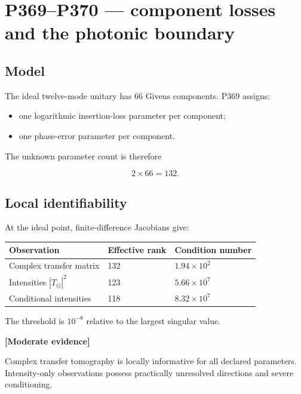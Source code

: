 \documentclass[11pt,a4paper,openany]{report}
\newcommand{\statusModerate}{\textcolor{finviolet}{[Moderate evidence]}}
\begin{document}
\chapter{P369--P370 --- component losses and the photonic boundary}

\section{Model}

The ideal twelve-mode unitary has 66 Givens components. P369 assigns:

\begin{itemize}
\item 
one logarithmic insertion-loss parameter per component;

\item 
one phase-error parameter per component.

\end{itemize}

The unknown parameter count is therefore

\[
2\times66=132.
\]

\section{Local identifiability}

At the ideal point, finite-difference Jacobians give:

\begin{center}
\begingroup\small
\setlength{\tabcolsep}{2.5pt}
\renewcommand{\arraystretch}{1.16}
\begin{longtable}{@{}p{}p{}p{}@{}}
\toprule
\textbf{Observation} & \textbf{Effective rank} & \textbf{Condition number} \\
\midrule
\endhead
Complex transfer matrix & 132 & \(1.94\times10^2\) \\
Intensities \(|T_{ij}|^2\) & 123 & \(5.66\times10^7\) \\
Conditional intensities & 118 & \(8.32\times10^7\) \\
\bottomrule
\end{longtable}
\endgroup
\end{center}

The threshold is \(10^{-8}\) relative to the largest singular value.

\textbf{\statusModerate{}}

Complex transfer tomography is locally informative for all declared parameters. Intensity-only observations possess practically unresolved directions and severe conditioning.
\end{document}
